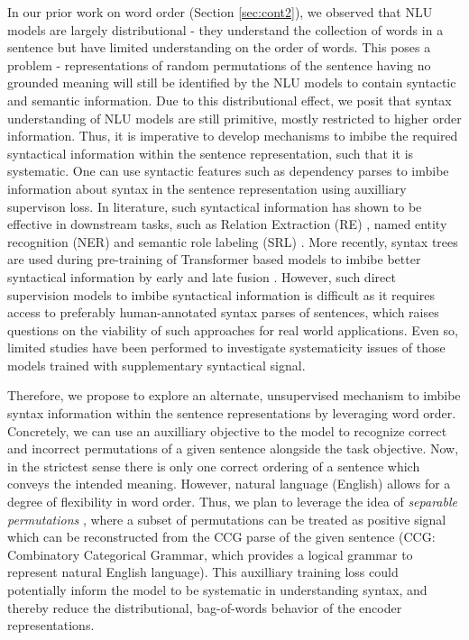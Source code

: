 \documentclass[12pt]{article}
\begin{document}
In our prior work on word order (Section \ref{sec:cont2}), we observed that NLU models are largely distributional - they understand the collection of words in a sentence but have limited understanding on the order of words. This poses a problem - representations of random permutations of the sentence having no grounded meaning will still be identified by the NLU models to contain syntactic and semantic information. Due to this distributional effect, we posit that syntax understanding of NLU models are still primitive, mostly restricted to higher order information. Thus, it is imperative to develop mechanisms to imbibe the required syntactical information within the sentence representation, such that it is systematic. One can use syntactic features such as dependency parses to imbibe information about syntax in the sentence representation using auxilliary supervison loss. In literature, such syntactical information has shown to be effective in downstream tasks, such as Relation Extraction (RE) \cite{fundel2007relex}, named entity recognition (NER) \cite{jie2019dependency} and semantic role labeling (SRL) \cite{strubell2018}. More recently, syntax trees are used during pre-training of Transformer based models to imbibe better syntactical information by early and late fusion \cite{sachan2021}. However, such direct supervision models to imbibe syntactical information is difficult as it requires access to preferably human-annotated syntax parses of sentences, which raises questions on the viability of such approaches for real world applications. Even so, limited studies have been performed to investigate systematicity issues of those models trained with supplementary syntactical signal.

Therefore, we propose to explore an alternate, unsupervised mechanism to imbibe syntax information within the sentence representations by leveraging word order. Concretely, we can use an auxilliary objective to the model to recognize correct and incorrect permutations of a given sentence alongside the task objective. Now, in the strictest sense there is only one correct ordering of a sentence which conveys the intended meaning. However, natural language (English) allows for a degree of flexibility in word order. Thus, we plan to leverage the idea of \textit{separable permutations} \cite{stanojevic2021}, where a subset of permutations can be treated as positive signal which can be reconstructed from the CCG parse of the given sentence (CCG: Combinatory Categorical Grammar, which provides a logical grammar to represent natural English language). This auxilliary training loss could potentially inform the model to be systematic in understanding syntax, and thereby reduce the distributional, bag-of-words behavior of the encoder representations.
\end{document}
